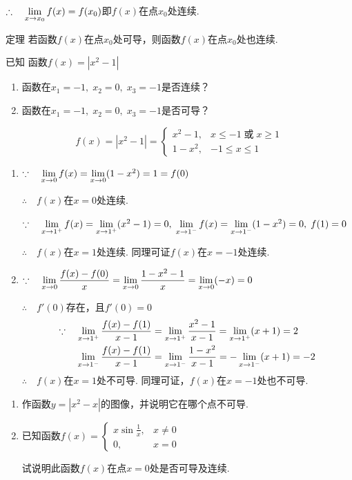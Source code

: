 $\therefore\quad \lim\limits_{x\to x_0}f(x)=f(x_0)$即$f(x)$在点$x_0$处连续.

\begin{thm}{定理}
    若函数$f(x)$在点$x_0$处可导，则函数$f(x)$在点$x_0$处也连续.
\end{thm}

\begin{example}
    已知 函数$f(x)=|x^2-1|$
\begin{enumerate}[(1)]
\item 函数在$x_1=-1,\; x_2=0,\; x_3=-1$是否连续？
\item 函数在$x_1=-1,\; x_2=0,\; x_3=-1$是否可导？
\end{enumerate}
\end{example}

\begin{solution}
\[f(x)=|x^2-1|=\begin{cases}
    x^2-1,& x\le -1\; \text{或}\; x\ge 1\\
    1-x^2,& -1\le x\le 1
\end{cases}\]
\begin{enumerate}[(1)]
    \item $\because\quad \lim\limits_{x\to 0}f(x)=\lim\limits_{x\to 0}(1-x^2)=1=f(0)$

    $\therefore\quad f(x)$在$x=0$处连续.

$\because\quad \lim\limits_{x\to 1^+}f(x)=\lim\limits_{x\to 1^+}(x^2-1)=0,\;  \lim\limits_{x\to 1^-}f(x)=\lim\limits_{x\to 1^-}(1-x^2)=0,\; f(1)=0$

$\therefore\quad f(x)$在$x=1$处连续. 同理可证$f(x)$在$x=-1$处连续.

\item $\because\quad \lim\limits_{x\to 0}\dfrac{f(x)-f(0)}{x}=\lim\limits_{x\to 0}\dfrac{1-x^2-1}{x}=\lim\limits_{x\to 0}(-x)=0$

$\therefore\quad f'(0)$存在，且$f'(0)=0$
\[\begin{split}
  \because\quad  \lim\limits_{x\to 1^+}\dfrac{f(x)-f(1)}{x-1}&= \lim\limits_{x\to 1^+}\dfrac{x^2-1}{x-1}= \lim\limits_{x\to 1^+}(x+1)=2\\
  \lim\limits_{x\to 1^-}\dfrac{f(x)-f(1)}{x-1}&=\lim\limits_{x\to 1^-}\dfrac{1-x^2}{x-1}=-\lim\limits_{x\to 1^-}(x+1)=-2
\end{split}\]
$\therefore\quad f(x)$在$x=1$处不可导. 同理可证，$f(x)$在$x=-1$处也不可导.
\end{enumerate}
\end{solution}

\begin{ex}
\begin{enumerate}
    \item 作函数$y=|x^2-x|$的图像，并说明它在哪个点不可导.
    \item 已知函数$f(x)=\begin{cases}
        x\sin\frac{1}{x},& x\ne 0\\
        0,& x=0
    \end{cases}$

    试说明此函数$f(x)$在点$x=0$处是否可导及连续.
\end{enumerate}
\end{ex}

